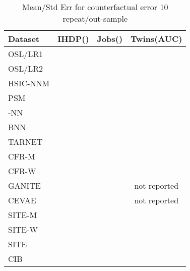 \documentclass{article}
\begin{document}
\begin{table}[ht]
  \caption{Mean/Std Err for counterfactual error 10 repeat/out-sample}
  \label{metric-out_full}
  \centering
  \begin{tabular}{lccc}
    \toprule
    Dataset & IHDP() & Jobs() & Twins(AUC) \\
    \midrule
    OSL/LR1 &  &  &  \\
    OSL/LR2 &  &  &  \\
    \midrule
    HSIC-NNM &  &  &  \\
    PSM &  &  &  \\
    -NN &  &  &  \\
    \midrule
    BNN &  &  &  \\
    TARNET &  &  &  \\
    CFR-M &  &  &  \\
    CFR-W &  &  &  \\
    GANITE &  &  & not reported\\
    CEVAE &  &  & not reported\\
    SITE-M &  &  &  \\
    SITE-W &  &  &  \\
    SITE &  &  & \\
    \midrule
    CIB &  &  &  \\
    \bottomrule
\end{tabular}
\end{table} 
\end{document}
